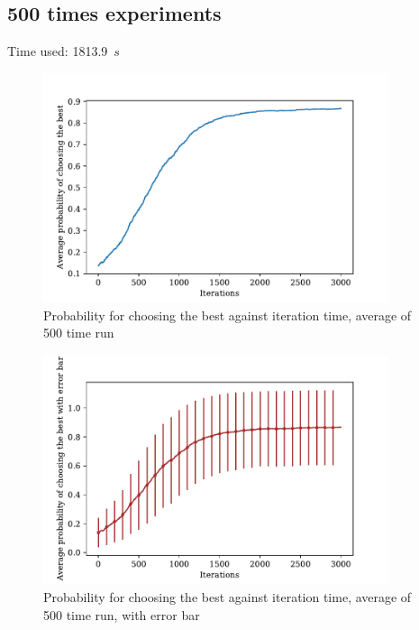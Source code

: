 \documentclass[a4paper,12pt]{article}
\begin{document}
\subsection{500 times experiments}
	Time used: 1813.9~${s}$
	\begin{figure}[H]
		\centering
		\includegraphics[width=0.9\textwidth]{Average_pbestnorm1_200_3000_500}
		\caption{Probability for choosing the best against iteration time, average of 500 time run}\label{Average_pbestnorm1_200_3000_500}
	\end{figure}
	\begin{figure}[H]
		\centering
		\includegraphics[width=0.9\textwidth]{Average_pbest_errbarnorm1_200_3000_500}
		\caption{Probability for choosing the best against iteration time, average of 500 time run, with error bar}\label{Average_pbest_errbarnorm1_200_3000_500}
	\end{figure}
\end{document}
